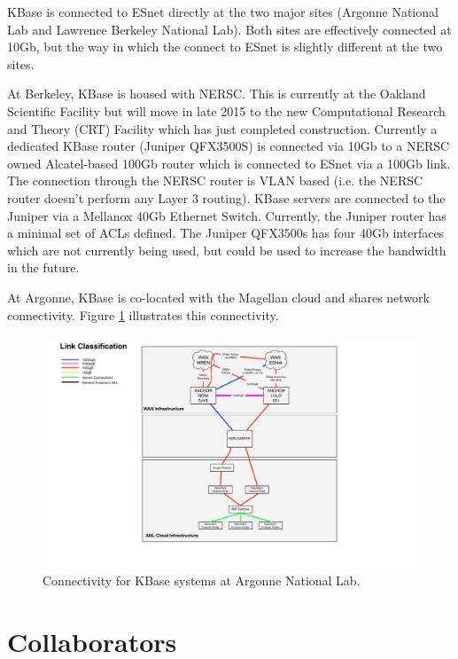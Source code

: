 \documentclass[10pt,a4paper]{report}
\begin{document}
KBase is connected to ESnet directly at the two major sites (Argonne National Lab and Lawrence Berkeley National Lab).  Both sites are effectively connected at 10Gb, but the way in which the connect to ESnet is slightly different at the two sites.

At Berkeley, KBase is housed with NERSC.  This is currently at the Oakland Scientific Facility but will move in late 2015 to the new Computational Research and Theory (CRT) Facility which has just completed construction.  Currently a dedicated KBase router (Juniper QFX3500S) is connected via 10Gb to a NERSC owned Alcatel-based 100Gb router which is connected to ESnet via a 100Gb link.  The connection through the NERSC router is VLAN based (i.e. the NERSC router doesn't perform any Layer 3 routing).  KBase servers are connected to the Juniper via a Mellanox 40Gb Ethernet Switch.  Currently, the Juniper router has a minimal set of ACLs defined.  The Juniper QFX3500s has four 40Gb interfaces which are not currently being used, but could be used to increase the bandwidth in the future.

At Argonne, KBase is co-located with the Magellan cloud and shares network connectivity.  Figure \ref{kbase:anl} illustrates this connectivity.

\begin{figure}[htbp]
\begin{center}
\includegraphics[width=5in]{anl-cloud.jpg}  
\caption{Connectivity for KBase systems at Argonne National Lab.}
\label{kbase:anl} 
\end{center}
\end{figure}


\section{Collaborators}
\end{document}

